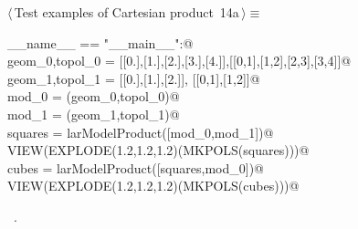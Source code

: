 \documentclass[11pt,oneside]{article}	%
\begin{document}
\begin{flushleft} \small
\begin{minipage}{\linewidth} \label{scrap21}
\protect{}$\langle\,$Test examples of Cartesian product\nobreak\ {\footnotesize 14a}$\,\rangle\equiv$
\vspace{-1ex}
\begin{list}{}{} \item
\mbox{}\verb@if __name__ == "__main__":@\\
\mbox{}\verb@    geom_0,topol_0 = [[0.],[1.],[2.],[3.],[4.]],[[0,1],[1,2],[2,3],[3,4]]@\\
\mbox{}\verb@    geom_1,topol_1 = [[0.],[1.],[2.]], [[0,1],[1,2]]@\\
\mbox{}\verb@    mod_0 = (geom_0,topol_0)@\\
\mbox{}\verb@    mod_1 = (geom_1,topol_1)@\\
\mbox{}\verb@    squares = larModelProduct([mod_0,mod_1])@\\
\mbox{}\verb@    VIEW(EXPLODE(1.2,1.2,1.2)(MKPOLS(squares)))@\\
\mbox{}\verb@    cubes = larModelProduct([squares,mod_0])@\\
\mbox{}\verb@    VIEW(EXPLODE(1.2,1.2,1.2)(MKPOLS(cubes)))@\\
\mbox{}\verb@@{\NWsep}
\end{list}
\vspace{-1ex}
\footnotesize\addtolength{\baselineskip}{-1ex}
\begin{list}{}{\setlength{\itemsep}{-\parsep}\setlength{\itemindent}{-\leftmargin}}
\item \NWtxtMacroRefIn\ .
\end{list}
\end{minipage}\\[4ex]
\end{flushleft}
\end{document}
